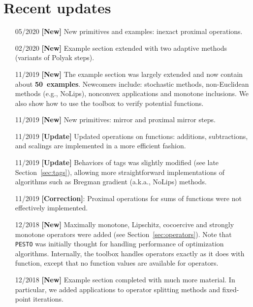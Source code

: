 \documentclass[11pt,a4paper]{article}
\begin{document}
	\section*{Recent updates}
	\begin{itemize}
		\item[05/2020] {\bf{}[New]} New primitives and examples: inexact proximal operations.
		\item[02/2020] {\bf{}[New]} Example section extended with two adaptive methods (variants of Polyak steps).
		\item[11/2019] {\bf{}[New]} The example section was largely extended and now contain about {\bf 50~examples}. Newcomers include:  stochastic methods, non-Euclidean methods (e.g., NoLips), nonconvex applications and monotone inclusions. We also show how to use the toolbox to verify potential functions.
		\item[11/2019] {\bf{}[New]} New primitives: mirror and proximal mirror steps.
		\item[11/2019] {\bf{}[Update]} Updated operations on functions: additions, subtractions, and scalings are implemented in a more efficient fashion.
		\item[11/2019] {\bf{}[Update]} Behaviors of tags was slightly modified (see late Section~\ref{sec:tags}), allowing more straightforward implementations of algorithms such as Bregman gradient (a.k.a., NoLips) methods.
		\item[11/2019] {\bf{}[Correction]}: Proximal operations for sums of functions were not effectively implemented.
		\item[12/2018] {\bf{}[New]} Maximally monotone, Lipschitz, cocoercive and strongly monotone operators were added (see Section~\ref{sec:operators}). Note that \verb|PESTO| was initially thought for handling performance of optimization algorithms. Internally, the toolbox handles operators exactly as it does with function, except that no function values are available for operators.
		\item[12/2018] {\bf{}[New]} Example section completed with much more material. In particular, we added applications to operator splitting methods and fixed-point iterations.
	\end{itemize}
	
\end{document}
